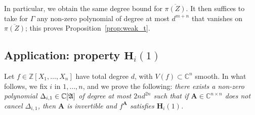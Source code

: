 \documentclass[sigconf]{acmart}
\def\mA{{\bm A}}
\def\C{\mathbb{C}}
\def\D{\Delta}
\newcommand{\ZZ}{{\mathbb{Z}}}
\def\A{\frak{A}}
\begin{document}
In particular, we obtain the same degree bound for
$\overline{\pi(Z)}$.  It then suffices to take for $\Gamma$ any
non-zero polynomial of degree at most $d^{m+n}$ that vanishes on
$\overline{\pi(Z)}$; this proves Proposition~\ref{prop:weak_t}.


\subsection{Application: property $\textbf{H}_i(1)$}\label{ssec:Hi1}

Let $f \in \ZZ[X_1,\hdots,X_n]$ have total degree $d$, with $V(f)
\subset \C^n$ smooth. In what follows, we fix $i$ in $1,\dots,n$, and
we prove the following: {\em there exists a non-zero polynomial
  $\D_{i,1} \in \C[\A]$ of degree at most $2nd^{2n}$ such that if $\mA
  \in \C^{n\times n}$ does not cancel $\D_{i,1}$, then $\mA$ is
  invertible and $f^\mA$ satisfies $\textbf{H}_i(1)$.}
\end{document}
